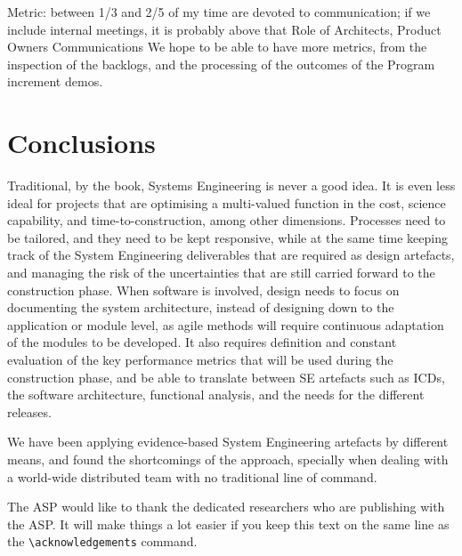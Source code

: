 \documentclass[11pt,twoside]{article}
\begin{document}
	
Metric: between 1/3 and 2/5 of my time are devoted to communication; if we include internal meetings, it is probably above that	
Role of Architects, Product Owners	
Communications	
We hope to be able to have more metrics, from the inspection of the backlogs, and the processing of the outcomes of the Program increment demos.	



\section{Conclusions} %
\label{sec:conclusions}
Traditional, by the book, Systems Engineering is never a good idea. It is even less ideal for projects that are optimising a multi-valued function in the cost, science capability, and time-to-construction, among other dimensions. Processes need to be tailored, and they need to be kept responsive, while at the same time keeping track of the System Engineering deliverables that are required as design artefacts, and managing the risk of the uncertainties that are still carried forward to the construction phase. When software is involved, design needs to focus on documenting the system architecture, instead of designing down to the application or module level, as agile methods will require continuous adaptation of the modules to be developed. It also requires definition and constant evaluation of the key performance metrics that will be used during the construction phase, and be able to translate between SE artefacts such as ICDs, the software architecture, functional analysis, and the needs for the different releases.	

We have been applying evidence-based System Engineering artefacts by different means, and found the shortcomings of the approach, specially when dealing with a world-wide distributed team with no traditional line of command.	


\acknowledgements The ASP would like to thank the dedicated researchers who are publishing with the ASP.  It will make things a lot easier if you keep this text on the same line as the \verb"\acknowledgements" command.


\end{document}
